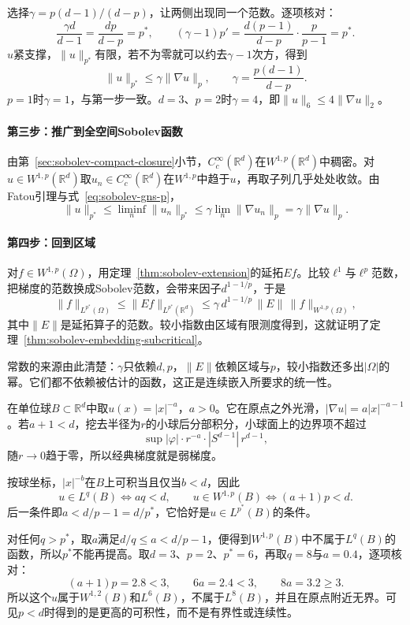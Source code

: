 选择$\gamma=p(d-1)/(d-p)$，让两侧出现同一个范数。逐项核对：
\[
\frac{\gamma d}{d-1}=\frac{dp}{d-p}=p^*,\qquad
(\gamma-1)p'=\frac{d(p-1)}{d-p}\cdot\frac p{p-1}=p^*.
\]
$u$紧支撑，$\lVert u\rVert_{p^*}$有限，若不为零就可以约去$\gamma-1$次方，得到
\begin{equation}
\lVert u\rVert_{p^*}\leq\gamma\lVert\nabla u\rVert_p,\qquad\gamma=\frac{p(d-1)}{d-p}.
\label{eq:sobolev-gns-p}
\end{equation}
$p=1$时$\gamma=1$，与第一步一致。$d=3$、$p=2$时$\gamma=4$，即$\lVert u\rVert_6\leq4\lVert\nabla u\rVert_2$。

\paragraph{第三步：推广到全空间Sobolev函数}
由第~\ref{sec:sobolev-compact-closure}小节，$C_c^\infty(\mathbb R^d)$在$W^{1,p}(\mathbb R^d)$中稠密。对$u\in W^{1,p}(\mathbb R^d)$取$u_n\in C_c^\infty(\mathbb R^d)$在$W^{1,p}$中趋于$u$，再取子列几乎处处收敛。由Fatou引理与式~\eqref{eq:sobolev-gns-p}，
\[
\lVert u\rVert_{p^*}\leq\liminf_n\lVert u_n\rVert_{p^*}\leq\gamma\lim_n\lVert\nabla u_n\rVert_p=\gamma\lVert\nabla u\rVert_p .
\]

\paragraph{第四步：回到区域}
对$f\in W^{1,p}(\Omega)$，用定理~\ref{thm:sobolev-extension}的延拓$Ef$。比较$\ell^1$与$\ell^p$范数，把梯度的范数换成Sobolev范数，会带来因子$d^{1-1/p}$，于是
\[
\lVert f\rVert_{L^{p^*}(\Omega)}\leq\lVert Ef\rVert_{L^{p^*}(\mathbb R^d)}
\leq\gamma\,d^{1-1/p}\,\lVert E\rVert\,\lVert f\rVert_{W^{1,p}(\Omega)},
\]
其中$\lVert E\rVert$是延拓算子的范数。较小指数由区域有限测度得到，这就证明了定理~\ref{thm:sobolev-embedding-subcritical}。

常数的来源由此清楚：$\gamma$只依赖$d,p$，$\lVert E\rVert$依赖区域与$p$，较小指数还多出$|\Omega|$的幂。它们都不依赖被估计的函数，这正是连续嵌入所要求的统一性。

\begin{example}[幂函数与指数的精确性]
\label{ex:sobolev-power-function}
在单位球$B\subset\mathbb R^d$中取$u(x)=|x|^{-a}$，$a>0$。它在原点之外光滑，$|\nabla u|=a|x|^{-a-1}$。若$a+1<d$，挖去半径为$r$的小球后分部积分，小球面上的边界项不超过
\[
\sup|\varphi|\cdot r^{-a}\cdot|S^{d-1}|\,r^{d-1},
\]
随$r\to0$趋于零，所以经典梯度就是弱梯度。

按球坐标，$|x|^{-b}$在$B$上可积当且仅当$b<d$，因此
\[
u\in L^q(B)\iff aq<d,\qquad u\in W^{1,p}(B)\iff(a+1)p<d .
\]
后一条件即$a<d/p-1=d/p^*$，它恰好是$u\in L^{p^*}(B)$的条件。

对任何$q>p^*$，取$a$满足$d/q\leq a<d/p-1$，便得到$W^{1,p}(B)$中不属于$L^q(B)$的函数，所以$p^*$不能再提高。取$d=3$、$p=2$、$p^*=6$，再取$q=8$与$a=0.4$，逐项核对：
\[
(a+1)p=2.8<3,\qquad 6a=2.4<3,\qquad 8a=3.2\geq3 .
\]
所以这个$u$属于$W^{1,2}(B)$和$L^6(B)$，不属于$L^8(B)$，并且在原点附近无界。可见$p<d$时得到的是更高的可积性，而不是有界性或连续性。
\end{example}

